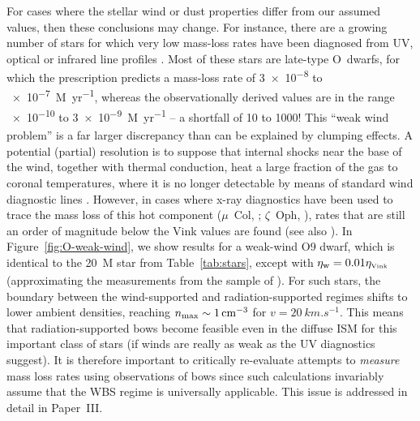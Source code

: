 For cases where the stellar wind or dust properties differ from our
assumed values, then these conclusions may change.  For instance,
there are a growing number of stars for which very low mass-loss rates
have been diagnosed from UV, optical or infrared line profiles
\citep{Martins:2005b, Marcolino:2009a, Najarro:2011a, Martins:2012a,
  Shenar:2017a, Smith:2017b}.  Most of these stars are late-type
O~dwarfs, for which the \citet{Vink:2000a} prescription predicts a
mass-loss rate of \num{3e-8} to \SI{e-7}{M_\odot.yr^{-1}}, whereas the
observationally derived values are in the range \num{e-10} to
\SI{3e-9}{M_\odot.yr^{-1}} -- a shortfall of 10 to 1000!  This ``weak wind
problem'' is a far larger discrepancy than can be explained by
clumping effects.  A potential (partial) resolution is to suppose that
internal shocks near the base of the wind, together with thermal
conduction, heat a large fraction of the gas to coronal temperatures,
where it is no longer detectable by means of standard wind diagnostic
lines \citep{Lucy:2012a}.  However, in cases where x-ray diagnostics
have been used to trace the mass loss of this hot component
(\(\mu\)~Col, \citealp{Huenemoerder:2012a}; \(\zeta\)~Oph,
\citealp{Cohen:2014a}), rates that are still an order of magnitude
below the Vink values are found (see also \citealp{Shenar:2017a}).  In
Figure~\ref{fig:O-weak-wind}, we show results for a weak-wind O9
dwarf, which is identical to the \SI{20}{M_\odot} star from
Table~\ref{tab:stars}, except with \(\eta_{\text{w}} = 0.01 \eta_{\text{\tiny Vink}}\)
(approximating the measurements from the sample of
\citealp{Martins:2005b}).  For such stars, the boundary between the
wind-supported and radiation-supported regimes shifts to lower ambient
densities, reaching \(n_{\text{max}} \sim \SI{1}{cm^{-3}}\) for
\(v = \SI{20}{km.s^{-1}}\).  This means that radiation-supported bows
become feasible even in the diffuse ISM for this important class of
stars (if winds are really as weak as the UV diagnostics suggest).  It
is therefore important to critically re-evaluate attempts to
\emph{measure} mass loss rates using observations of bows
\citep{Gvaramadze:2012a, Kobulnicky:2018a} since such calculations
invariably assume that the WBS regime is universally applicable.  This
issue is addressed in detail in Paper~III.

